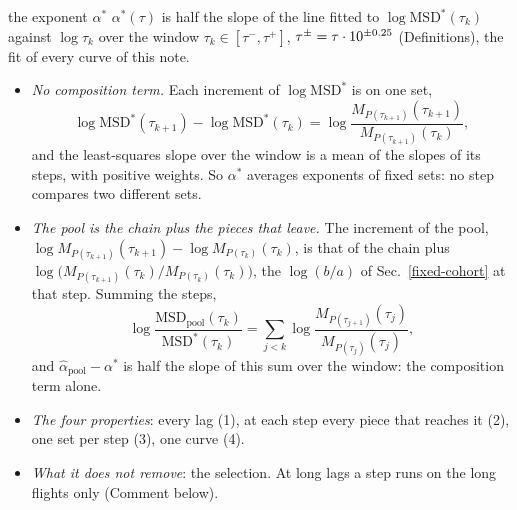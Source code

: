 \documentclass[10pt,a4paper]{article}
\begin{document}
\begin{method}{the exponent $\alpha^*$}
  $\alpha^*(\tau)$ is half the slope of the line fitted to $\log\mathrm{MSD}^*(\tau_k)$ against $\log\tau_k$ over
  the window $\tau_k\in[\tau^-,\tau^+]$, $\tau^\pm=\tau\cdot10^{\pm0.25}$ (Definitions), the fit of every
  curve of this note.
  \begin{itemize}
  \item \emph{No composition term.} Each increment of $\log\mathrm{MSD}^*$ is on one set,
    \[ \log\mathrm{MSD}^*(\tau_{k+1})-\log\mathrm{MSD}^*(\tau_k)=\log\frac{M_{P(\tau_{k+1})}(\tau_{k+1})}{M_{P(\tau_{k+1})}(\tau_k)}, \]
    and the least-squares slope over the window is a mean of the slopes of its steps, with positive weights.
    So $\alpha^*$ averages exponents of fixed sets: no step compares two different sets.
  \item \emph{The pool is the chain plus the pieces that leave.} The increment of the pool,
    $\log M_{P(\tau_{k+1})}(\tau_{k+1})-\log M_{P(\tau_k)}(\tau_k)$, is that of the chain plus
    $\log\big(M_{P(\tau_{k+1})}(\tau_k)/M_{P(\tau_k)}(\tau_k)\big)$, the $\log(b/a)$ of Sec.~\ref{fixed-cohort}
    at that step. Summing the steps,
    \[ \log\frac{\mathrm{MSD}_\mathrm{pool}(\tau_k)}{\mathrm{MSD}^*(\tau_k)}=\sum_{j<k}\log\frac{M_{P(\tau_{j+1})}(\tau_j)}{M_{P(\tau_j)}(\tau_j)}, \]
    and $\hat\alpha_\mathrm{pool}-\alpha^*$ is half the slope of this sum over the window: the composition term
    alone.
  \item \emph{The four properties}: every lag (1), at each step every piece that reaches it (2), one set per
    step (3), one curve (4).
  \item \emph{What it does not remove}: the selection. At long lags a step runs on the long flights only
    (Comment below).
  \end{itemize}
\end{method}
\end{document}
